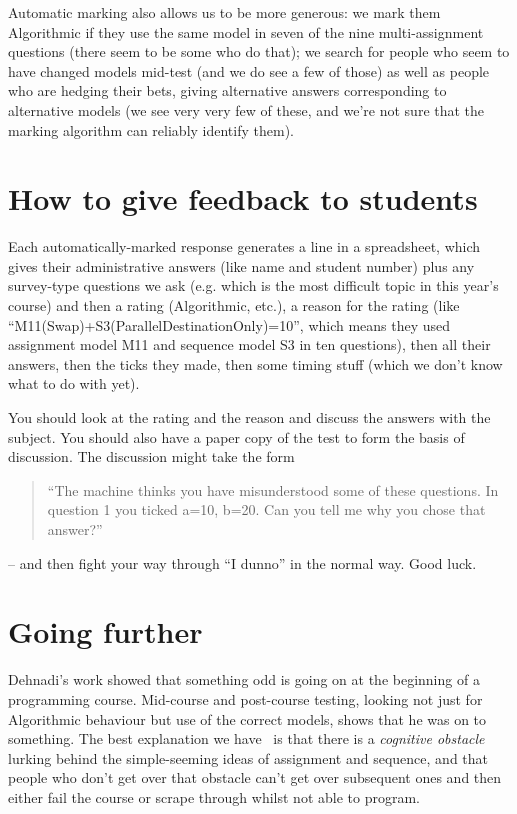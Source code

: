 \documentclass[11pt,a4paper]{article}
\begin{document}
Automatic marking also allows us to be more generous: we mark them Algorithmic if they use the same model in seven of the nine multi-assignment questions (there seem to be some who do that); we search for people who seem to have changed models mid-test (and we do see a few of those) as well as people who are hedging their bets, giving alternative answers corresponding to alternative models (we see very very few of these, and we're not sure that the marking algorithm can reliably identify them).

\section{How to give feedback to students}

Each automatically-marked response generates a line in a spreadsheet, which gives their administrative answers (like name and student number) plus any survey-type questions we ask (e.g. which is the most difficult topic in this year's course) and then a rating (Algorithmic, etc.), a reason for the rating (like ``M11(Swap)+S3(ParallelDestinationOnly)=10'', which means they used assignment model M11 and sequence model S3 in ten questions), then all their answers, then the ticks they made, then some timing stuff (which we don't know what to do with yet). 

You should look at the rating and the reason and discuss the answers with the subject. You should also have a paper copy of the test to form the basis of discussion. The discussion might take the form
\begin{quote}
``The machine thinks you have misunderstood some of these questions. In question 1 you ticked a=10, b=20. Can you tell me why you chose that answer?''
\end{quote}
-- and then fight your way through ``I dunno'' in the normal way. Good luck.

\section{Going further}

Dehnadi's work showed that something odd is going on at the beginning of a programming course. Mid-course and post-course testing, looking not just for Algorithmic behaviour but use of the correct models, shows that he was on to something. The best explanation we have~\citep{RobinsLearningedgemomentum2010} is that there is a \emph{cognitive obstacle} lurking behind the simple-seeming ideas of assignment and sequence, and that people who don't get over that obstacle can't get over subsequent ones and then either fail the course or scrape through whilst not able to program. 
\end{document}
